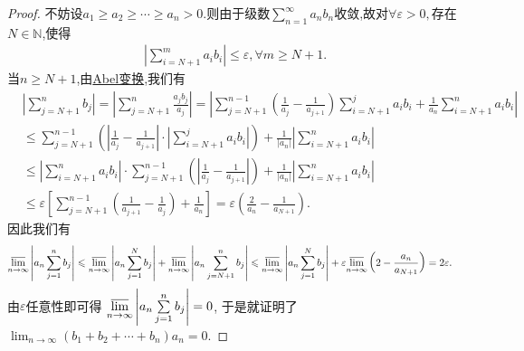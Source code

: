 \documentclass[../../main.tex]{subfiles}%
\begin{document}
\begin{proof}
不妨设\(a_1 \geqslant a_2 \geqslant \cdots \geqslant a_n > 0\).则由于级数\(\sum\limits_{n = 1}^{\infty} a_n b_n\)收敛,故对$\forall \varepsilon >0,$存在\(N \in \mathbb{N}\),使得
\begin{align*}
\left|\sum\limits_{i = N + 1}^{m} a_i b_i\right| \leqslant \varepsilon, \forall m \geqslant N + 1.
\end{align*}
当\(n \geqslant N + 1\),由\hyperref[theorem:Abel变换]{Abel变换},我们有
\begin{align*}
&\left|\sum\limits_{j = N + 1}^{n} b_j\right| = \left|\sum\limits_{j = N + 1}^{n} \frac{a_j b_j}{a_j}\right|
= \left|\sum\limits_{j = N + 1}^{n - 1} \left(\frac{1}{a_j} - \frac{1}{a_{j + 1}}\right) \sum\limits_{i = N + 1}^{j} a_i b_i + \frac{1}{a_n} \sum\limits_{i = N + 1}^{n} a_i b_i\right|
\\
&\leqslant \sum\limits_{j = N + 1}^{n - 1} \left(\left|\frac{1}{a_j} - \frac{1}{a_{j + 1}}\right| \cdot \left|\sum\limits_{i = N + 1}^{j} a_i b_i\right|\right) + \frac{1}{|a_n|} \left|\sum\limits_{i = N + 1}^{n} a_i b_i\right|
\\
&\leqslant \left|\sum\limits_{i = N + 1}^{n} a_i b_i\right|\cdot\sum\limits_{j = N + 1}^{n - 1} \left(\left|\frac{1}{a_j} - \frac{1}{a_{j + 1}}\right| \right) + \frac{1}{|a_n|} \left|\sum\limits_{i = N + 1}^{n} a_i b_i\right|
\\
&\leqslant \varepsilon \left[\sum\limits_{j = N + 1}^{n - 1} \left(\frac{1}{a_{j + 1}} - \frac{1}{a_j}\right) + \frac{1}{a_n}\right]
= \varepsilon \left(\frac{2}{a_n} - \frac{1}{a_{N + 1}}\right).
\end{align*}
因此我们有
\begin{align*}
&\underset{n\rightarrow \infty}{{\varlimsup }} \left|a_n \sum\limits_{j = 1}^{n} b_j\right| \leqslant \underset{n\rightarrow \infty}{{\varlimsup }} \left|a_n \sum\limits_{j = 1}^{N} b_j\right| + \underset{n\rightarrow \infty}{{\varlimsup }} \left|a_n \sum\limits_{j = N + 1}^{n} b_j\right|
\leqslant \underset{n\rightarrow \infty}{{\varlimsup }} \left|a_n \sum\limits_{j = 1}^{N} b_j\right| + \varepsilon \underset{n\rightarrow \infty}{{\varlimsup }} \left(2 - \frac{a_n}{a_{N + 1}}\right)= 2\varepsilon.
\end{align*}
由\(\varepsilon\)任意性即可得
\(\underset{n\rightarrow \infty}{{\varlimsup }} \left|a_n \sum\limits_{j = 1}^{n} b_j\right| = 0\),
于是就证明了
\(\lim_{n \to \infty} (b_1 + b_2 + \cdots + b_n)a_n = 0\).
\end{proof}
\end{document}
